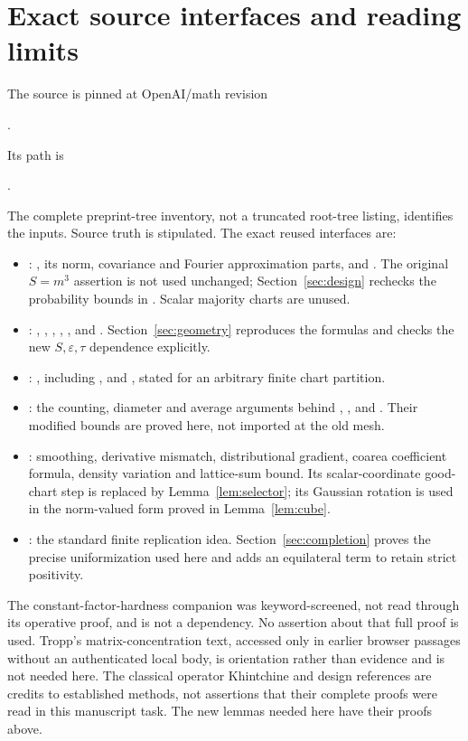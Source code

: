 \documentclass[11pt]{article}
\theoremstyle{remark}\newtheorem{remark}[theorem]{Remark}
\numberwithin{equation}{section}
\begin{document}
\appendix
\section{Exact source interfaces and reading limits}\label{sec:source}
The source \cite{source} is pinned at OpenAI/math revision
\begin{center}\small{}.\end{center}
Its path is
\begin{center}\small{}.\end{center}
The complete preprint-tree inventory, not a truncated root-tree listing,
identifies the inputs. Source truth is stipulated. The exact reused
interfaces are:
\begin{itemize}
\item {}: , its norm,
covariance and Fourier approximation parts, and
. The original $S=m^3$ assertion is not used
unchanged; Section~\ref{sec:design} rechecks the probability bounds in
. Scalar majority charts are unused.
\item {}: ,
, ,
, ,
 and .
Section~\ref{sec:geometry} reproduces the formulas and checks the new
$S,\varepsilon,\tau$ dependence explicitly.
\item {}: , including
,  and
, stated for an arbitrary finite chart partition.
\item {}: the counting, diameter and average arguments
behind , ,
 and .
Their modified bounds are proved here, not imported at the old mesh.
\item {}: smoothing, derivative mismatch,
distributional gradient, coarea coefficient formula, density variation
and lattice-sum bound. Its scalar-coordinate good-chart step is replaced
by Lemma~\ref{lem:selector}; its Gaussian rotation is used in the
norm-valued form proved in Lemma~\ref{lem:cube}.
\item {}: the standard finite replication idea.
Section~\ref{sec:completion} proves the precise uniformization used here
and adds an equilateral term to retain strict positivity.
\end{itemize}
The constant-factor-hardness companion was keyword-screened, not read
through its operative proof, and is not a dependency. No assertion about
that full proof is used. Tropp's matrix-concentration text, accessed only
in earlier browser passages without an authenticated local body, is
orientation rather than evidence and is not needed here. The classical
operator Khintchine and design references are credits to established
methods, not assertions that their complete proofs were read in this
manuscript task. The new lemmas needed here have their proofs above.
\end{document}
